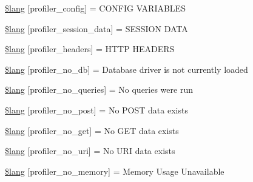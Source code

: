 \begin{DoxyCompactItemize}
\hyperlink{system_2language_2english_2profiler__lang_8php_a68a43f2ac48abfc21cd12ee19e75e421}{\$lang} \mbox{[}\textquotesingle{}profiler\+\_\+config\textquotesingle{}\mbox{]} = \textquotesingle{}C\+O\+N\+F\+I\+G V\+A\+R\+I\+A\+B\+L\+E\+S\textquotesingle{}
\item 
\hyperlink{system_2language_2english_2profiler__lang_8php_a6caa2b856b3211345f4a916febd79a84}{\$lang} \mbox{[}\textquotesingle{}profiler\+\_\+session\+\_\+data\textquotesingle{}\mbox{]} = \textquotesingle{}S\+E\+S\+S\+I\+O\+N D\+A\+T\+A\textquotesingle{}
\item 
\hyperlink{system_2language_2english_2profiler__lang_8php_a079eb6971dec0c6115344e4b621e235f}{\$lang} \mbox{[}\textquotesingle{}profiler\+\_\+headers\textquotesingle{}\mbox{]} = \textquotesingle{}H\+T\+T\+P H\+E\+A\+D\+E\+R\+S\textquotesingle{}
\item 
\hyperlink{system_2language_2english_2profiler__lang_8php_a74da0e429477e757130da70e135d4ae9}{\$lang} \mbox{[}\textquotesingle{}profiler\+\_\+no\+\_\+db\textquotesingle{}\mbox{]} = \textquotesingle{}Database driver is not currently loaded\textquotesingle{}
\item 
\hyperlink{system_2language_2english_2profiler__lang_8php_a783abf2a3410bbc9c32e4b7bb774724b}{\$lang} \mbox{[}\textquotesingle{}profiler\+\_\+no\+\_\+queries\textquotesingle{}\mbox{]} = \textquotesingle{}No queries were run\textquotesingle{}
\item 
\hyperlink{system_2language_2english_2profiler__lang_8php_a06e8171d08be812398060c126233a237}{\$lang} \mbox{[}\textquotesingle{}profiler\+\_\+no\+\_\+post\textquotesingle{}\mbox{]} = \textquotesingle{}No P\+O\+S\+T data exists\textquotesingle{}
\item 
\hyperlink{system_2language_2english_2profiler__lang_8php_a8ecf037acbeb4a7b202b8238c8d1a328}{\$lang} \mbox{[}\textquotesingle{}profiler\+\_\+no\+\_\+get\textquotesingle{}\mbox{]} = \textquotesingle{}No G\+E\+T data exists\textquotesingle{}
\item 
\hyperlink{system_2language_2english_2profiler__lang_8php_ac7d16f2f99b12aeaa609be6bcb89759e}{\$lang} \mbox{[}\textquotesingle{}profiler\+\_\+no\+\_\+uri\textquotesingle{}\mbox{]} = \textquotesingle{}No U\+R\+I data exists\textquotesingle{}
\item 
\hyperlink{system_2language_2english_2profiler__lang_8php_a32345afdaa3f160ba1d21d03223313ad}{\$lang} \mbox{[}\textquotesingle{}profiler\+\_\+no\+\_\+memory\textquotesingle{}\mbox{]} = \textquotesingle{}Memory Usage Unavailable\textquotesingle{}
\item 

\end{DoxyCompactItemize}
